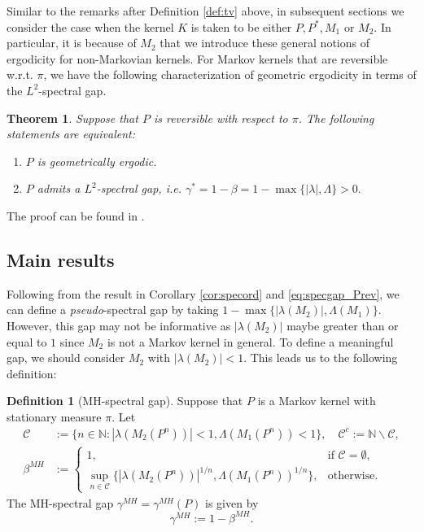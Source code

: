 \documentclass[12pt,a4]{amsart}
\numberwithin{equation}{section}
\theoremstyle{plain}
\newtheorem{theorem}{Theorem}[section]
\theoremstyle{definition}
\newtheorem{definition}{Definition}[section]
\theoremstyle{remark}
\newcommand{\1}{\mathds{1}}
\begin{document}
Similar to the remarks after Definition \ref{def:tv} above, in subsequent sections we consider the case when the kernel $K$ is taken to be either $P, P^*, M_1$ or $M_2$. In particular, it is because of $M_2$ that we introduce these general notions of ergodicity for non-Markovian kernels. For Markov kernels that are reversible w.r.t. $\pi$, we have the following characterization of geometric ergodicity in terms of the $L^2$-spectral gap.

\begin{theorem}\label{thm:RR97}
	Suppose that $P$ is reversible with respect to $\pi$. The following statements are equivalent:
	\begin{enumerate}[label={\upshape(\roman*)}, align=left, widest=iii, leftmargin=*]
		\item $P$ is geometrically ergodic.
		
		\item $P$ admits a $L^2$-spectral gap, i.e. $\gamma^* = 1 - \beta = 1 - \max\{|\lambda|,\Lambda\} > 0.$
	\end{enumerate}
\end{theorem}

The proof can be found in \citet{RR97}.

\subsection{Main results}\label{subsec:main}

Following from the result in Corollary \ref{cor:specord} and \eqref{eq:specgap_Prev}, we can define a \textit{pseudo}-spectral gap by taking $1 - \max\{|\lambda(M_2)|,\Lambda(M_1)\}$. However, this gap may not be informative as $|\lambda(M_2)|$ maybe greater than or equal to $1$ since $M_2$ is not a Markov kernel in general. To define a meaningful gap, we should consider $M_2$ with $|\lambda(M_2)| < 1$. This leads us to the following definition:

\begin{definition}[MH-spectral gap]\label{def:MHspecgap}
	Suppose that $P$ is a Markov kernel with stationary measure $\pi$. Let
	\begin{align*}
		\mathcal{C} &:= \{ n \in \mathbb{N} : |\lambda(M_2(P^n))| < 1, \Lambda(M_1(P^n)) < 1 \}, \quad \mathcal{C}^c := \mathbb{N} \backslash \mathcal{C},\\
		\beta^{MH}  &:= \begin{cases}
		1, &\text{if $\mathcal{C} = \emptyset$,}\\
		\sup_{n \in \mathcal{C}}\{ |\lambda(M_2(P^n))|^{1/n}, \Lambda(M_1(P^n))^{1/n} \}, &\text{otherwise.}
		\end{cases}
	\end{align*}
	The MH-spectral gap $\gamma^{MH} = \gamma^{MH}(P)$ is given by
	$$\gamma^{MH} := 1 - \beta^{MH}.$$
\end{definition}
\end{document}
